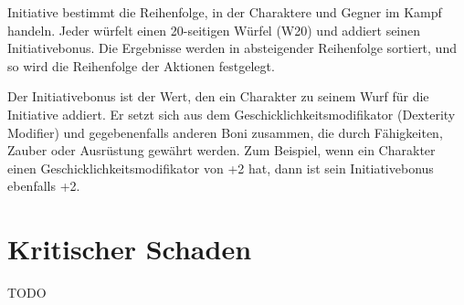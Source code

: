 Initiative bestimmt die Reihenfolge, in der Charaktere und Gegner im Kampf handeln. Jeder würfelt einen 20-seitigen Würfel (W20) und addiert seinen Initiativebonus. Die Ergebnisse werden in absteigender Reihenfolge sortiert, und so wird die Reihenfolge der Aktionen festgelegt.

Der Initiativebonus ist der Wert, den ein Charakter zu seinem Wurf für die Initiative addiert. Er setzt sich aus dem Geschicklichkeitsmodifikator (Dexterity Modifier) und gegebenenfalls anderen Boni zusammen, die durch Fähigkeiten, Zauber oder Ausrüstung gewährt werden. Zum Beispiel, wenn ein Charakter einen Geschicklichkeitsmodifikator von +2 hat, dann ist sein Initiativebonus ebenfalls +2.

\section{Kritischer Schaden}
\label{sec:crit}
TODO